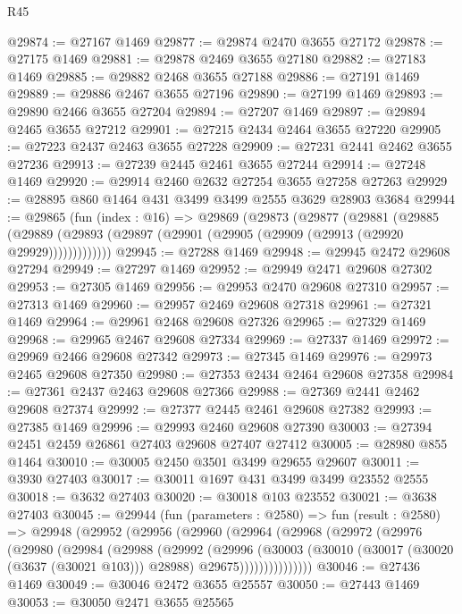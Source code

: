 \begin{lexlean}{R45}
\begin{coremodule}
@29874 := @27167 @1469
@29877 := @29874 @2470 @3655 @27172
@29878 := @27175 @1469
@29881 := @29878 @2469 @3655 @27180
@29882 := @27183 @1469
@29885 := @29882 @2468 @3655 @27188
@29886 := @27191 @1469
@29889 := @29886 @2467 @3655 @27196
@29890 := @27199 @1469
@29893 := @29890 @2466 @3655 @27204
@29894 := @27207 @1469
@29897 := @29894 @2465 @3655 @27212
@29901 := @27215 @2434 @2464 @3655 @27220
@29905 := @27223 @2437 @2463 @3655 @27228
@29909 := @27231 @2441 @2462 @3655 @27236
@29913 := @27239 @2445 @2461 @3655 @27244
@29914 := @27248 @1469
@29920 := @29914 @2460 @2632 @27254 @3655 @27258 @27263
@29929 := @28895 @860 @1464 @431 @3499 @3499 @2555 @3629 @28903 @3684
@29944 := @29865
    (fun (index : @16) =>
    @29869
      (@29873
        (@29877
          (@29881
            (@29885
              (@29889 (@29893 (@29897 (@29901 (@29905 (@29909 (@29913 (@29920 @29929)))))))))))))
@29945 := @27288 @1469
@29948 := @29945 @2472 @29608 @27294
@29949 := @27297 @1469
@29952 := @29949 @2471 @29608 @27302
@29953 := @27305 @1469
@29956 := @29953 @2470 @29608 @27310
@29957 := @27313 @1469
@29960 := @29957 @2469 @29608 @27318
@29961 := @27321 @1469
@29964 := @29961 @2468 @29608 @27326
@29965 := @27329 @1469
@29968 := @29965 @2467 @29608 @27334
@29969 := @27337 @1469
@29972 := @29969 @2466 @29608 @27342
@29973 := @27345 @1469
@29976 := @29973 @2465 @29608 @27350
@29980 := @27353 @2434 @2464 @29608 @27358
@29984 := @27361 @2437 @2463 @29608 @27366
@29988 := @27369 @2441 @2462 @29608 @27374
@29992 := @27377 @2445 @2461 @29608 @27382
@29993 := @27385 @1469
@29996 := @29993 @2460 @29608 @27390
@30003 := @27394 @2451 @2459 @26861 @27403 @29608 @27407 @27412
@30005 := @28980 @855 @1464
@30010 := @30005 @2450 @3501 @3499 @29655 @29607
@30011 := @3930 @27403
@30017 := @30011 @1697 @431 @3499 @3499 @23552 @2555
@30018 := @3632 @27403
@30020 := @30018 @103 @23552
@30021 := @3638 @27403
@30045 := @29944
    (fun (parameters : @2580) =>
    fun (result : @2580) =>
    @29948
      (@29952
        (@29956
          (@29960
            (@29964
              (@29968
                (@29972
                  (@29976
                    (@29980
                      (@29984
                        (@29988
                          (@29992
                            (@29996
                              (@30003
                                (@30010
                                  (@30017 (@30020 (@3637 (@30021 @103))) @28988)
                                  @29675)))))))))))))))
@30046 := @27436 @1469
@30049 := @30046 @2472 @3655 @25557
@30050 := @27443 @1469
@30053 := @30050 @2471 @3655 @25565

\end{coremodule}
\end{lexlean}
